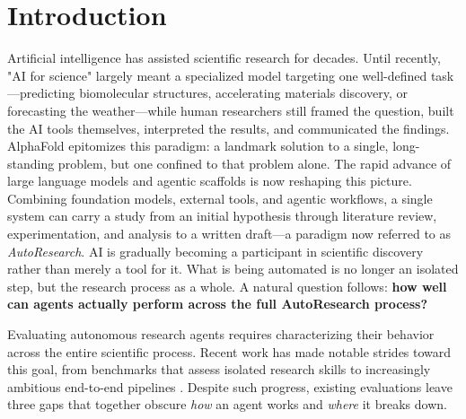 \section{Introduction}
\label{sec:intro}

Artificial intelligence has assisted scientific research for decades. Until recently, "AI for science" largely meant a specialized model targeting one well-defined task—predicting biomolecular structures\citep{jumper2021highly,krishna2024generalized,lin2023evolutionary,chai2024chai,wohlwend2025boltz,passaro2025boltz,wu2022high,evans2021protein}, accelerating materials discovery\cite{merchant2023scaling,zeni2025generative,xie2018crystal,deng2023chgnet,batatia2022mace}, or forecasting the weather\cite{lam2023learning,bi2022pangu}—while human researchers still framed the question, built the AI tools themselves, interpreted the results, and communicated the findings. AlphaFold\cite{jumper2021highly} epitomizes this paradigm: a landmark solution to a single, long-standing problem, but one confined to that problem alone. The rapid advance of large language models and agentic scaffolds is now reshaping this picture. Combining foundation models, external tools, and agentic workflows, a single system can carry a study from an initial hypothesis through literature review, experimentation, and analysis to a written draft—a paradigm now referred to as \emph{AutoResearch}\cite{tie2026autoresearch,kong2026ai,zhang2026far}. AI is gradually becoming a participant in scientific discovery rather than merely a tool for it. What is being automated is no longer an isolated step, but the research process as a whole. A natural question follows: \textbf{how well can agents actually perform across the full AutoResearch process?}



Evaluating autonomous research agents requires characterizing their behavior across the entire scientific process. Recent work has made notable strides toward this goal, from benchmarks that assess isolated research skills \citep{rein2023gpqa, phan2025humanity, tian2024scicode, siegel2024core, hu2025repro, starace2025paperbench} to increasingly ambitious end-to-end pipelines \citep{wang2026naturebench, xu2026researchclawbench, bragg2026astabench}. Despite such progress, existing evaluations leave three gaps that together obscure \emph{how} an agent works and \emph{where} it breaks down.



